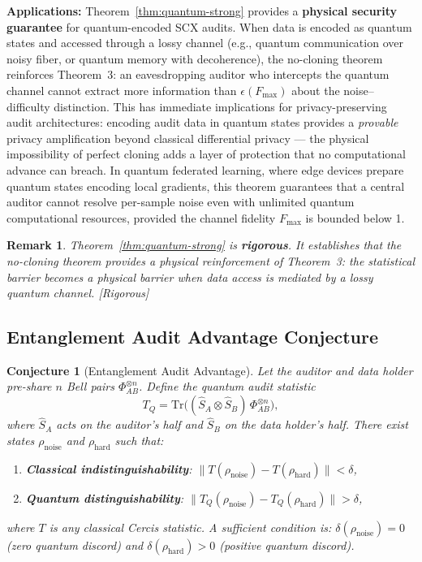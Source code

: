 \documentclass[12pt,a4paper]{article}
\newtheorem{remark}[theorem]{Remark}
\newtheorem{conjecture}[theorem]{Conjecture}
\newcommand{\rigorous}{\textcolor{green!50!black}{\small\textsf{[Rigorous]}}}
\newcommand{\Tr}{\mathrm{Tr}}
\begin{document}
\medskip\noindent
\textbf{Applications:}
Theorem~\ref{thm:quantum-strong} provides a \textbf{physical security
guarantee} for quantum-encoded SCX audits.  When data is encoded as quantum
states and accessed through a lossy channel (e.g., quantum communication over
noisy fiber, or quantum memory with decoherence), the no-cloning theorem
reinforces Theorem~3: an eavesdropping auditor who intercepts the quantum
channel cannot extract more information than $\epsilon(F_{\max})$ about the
noise--difficulty distinction.  This has immediate implications for
privacy-preserving audit architectures: encoding audit data in quantum states
provides a \emph{provable} privacy amplification beyond classical
differential privacy — the physical impossibility of perfect cloning adds a
layer of protection that no computational advance can breach.  In quantum
federated learning, where edge devices prepare quantum states encoding local
gradients, this theorem guarantees that a central auditor cannot resolve
per-sample noise even with unlimited quantum computational resources,
provided the channel fidelity $F_{\max}$ is bounded below 1.

\begin{remark}
Theorem~\ref{thm:quantum-strong} is \textbf{rigorous}.  It establishes that the
no-cloning theorem provides a \emph{physical reinforcement} of Theorem~3: the
statistical barrier becomes a physical barrier when data access is mediated by
a lossy quantum channel.  \rigorous
\end{remark}

\subsection{Entanglement Audit Advantage Conjecture}

\begin{conjecture}[Entanglement Audit Advantage]
\label{conj:entanglement}
Let the auditor and data holder pre-share $n$ Bell pairs $\Phi_{AB}^{\otimes n}$.
Define the quantum audit statistic
\begin{equation}\label{eq:TQ}
    T_Q = \Tr\big((\hat{S}_A\otimes\hat{S}_B)\,\Phi_{AB}^{\otimes n}\big),
\end{equation}
where $\hat{S}_A$ acts on the auditor's half and $\hat{S}_B$ on the data
holder's half.  There exist states $\rho_{\mathrm{noise}}$ and
$\rho_{\mathrm{hard}}$ such that:
\begin{enumerate}[label=(\roman*)]
    \item \textbf{Classical indistinguishability}:
          $\|T(\rho_{\mathrm{noise}})-T(\rho_{\mathrm{hard}})\|<\delta$,
    \item \textbf{Quantum distinguishability}:
          $\|T_Q(\rho_{\mathrm{noise}})-T_Q(\rho_{\mathrm{hard}})\|>\delta$,
\end{enumerate}
where $T$ is any classical Cercis statistic.  A sufficient condition is:
$\delta(\rho_{\mathrm{noise}})=0$ (zero quantum discord) and
$\delta(\rho_{\mathrm{hard}})>0$ (positive quantum discord).
\end{conjecture}
\end{document}
